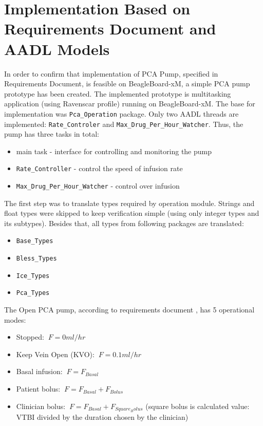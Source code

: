 \clearpage


\section{Implementation Based on Requirements Document and AADL Models}
\label{pcapumpimpl:manual}

In order to confirm that implementation of PCA Pump, specified in Requirements Document, is feasible on BeagleBoard-xM, a simple PCA pump prototype has been created. The implemented prototype is multitasking application (using Ravenscar profile) running on BeagleBoard-xM. The base for implementation was \lstinline{Pca_Operation} package. Only two AADL threads are implemented: \lstinline{Rate_Controler} and \lstinline{Max_Drug_Per_Hour_Watcher}. Thus, the pump has three tasks in total:
\begin{itemize} \itemsep0pt \parskip0pt 
    \item main task - interface for controlling and monitoring the pump
    \item \lstinline{Rate_Controller} - control the speed of infusion rate
    \item \lstinline{Max_Drug_Per_Hour_Watcher} - control over infusion
\end{itemize}

The first step was to translate types required by operation module. Strings and float types were skipped to keep verification simple (using only integer types and its subtypes). Besides that, all types from following packages are translated:
\begin{itemize} \itemsep0pt \parskip0pt 
	\item \lstinline{Base_Types}
	\item \lstinline{Bless_Types}
	\item \lstinline{Ice_Types}
	\item \lstinline{Pca_Types}
\end{itemize}

The Open PCA pump, according to requirements document \cite{PcaReq}, has 5 operational modes:
\begin{itemize} \itemsep0pt \parskip0pt 
	\item Stopped: $\displaystyle\ F = 0 ml/hr$
	\item Keep Vein Open (KVO): $\displaystyle\ F = 0.1 ml/hr$
	\item Basal infusion: $\displaystyle\ F = F_{Basal}$
	\item Patient bolus: $\displaystyle\ F = F_{Basal} + F_{Bolus}$
	\item Clinician bolus: $\displaystyle\ F = F_{Basal} + F_{Square_Bolus}$ (square bolus is calculated value: VTBI divided by the duration chosen by the clinician)
\end{itemize}

